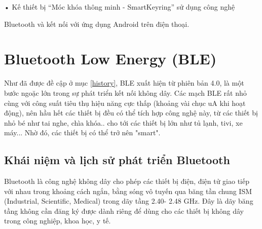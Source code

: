 • Kế thiết bị “Móc khóa thông minh - SmartKeyring” sử dụng công nghệ

Bluetooth và kết nối với ứng dụng Android trên điện thoại.

\nomenclature[g-p]{$\pi$}{ $\simeq 3.14\ldots$}                                             %

\section{Bluetooth Low Energy (BLE) }  %
\label{section1.3} %
Như đã được đề cập ở mục \ref{history}, BLE xuất hiện từ phiên bản 4.0, là một bước ngoặc lớn trong sự phát triển kết nối không dây. Các mạch BLE rất nhỏ cùng với công suất tiêu thụ hiệu năng cực thấp (khoảng vài chục uA khi hoạt động), nên hầu hết các thiết bị đều có thể tích hợp công nghệ này, từ các thiết bị nhỏ bé như tai nghe, chìa khóa.. cho tới các thiết bị lớn như tủ lạnh, tivi, xe máy... Nhờ đó, các thiết bị có thể trở nên "smart".

\subsection{Khái niệm và lịch sử phát triển Bluetooth}
Bluetooth là công nghệ không dây cho phép các thiết bị điện, điện tử giao tiếp với nhau trong khoảng cách ngắn, bằng sóng vô tuyến qua băng tần chung ISM (Industrial, Scientific, Medical) trong dãy tầng 2.40- 2.48 GHz. Đây là dãy băng tầng không cần đăng ký được dành riêng để dùng cho các thiết bị không dây trong công nghiệp, khoa học, y tế.

